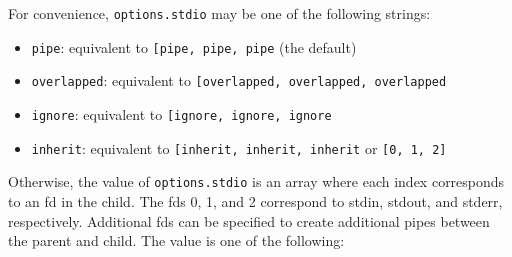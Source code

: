 For convenience, \texttt{options.stdio} may be one of the following
strings:

\begin{itemize}
\tightlist
\item
  \texttt{\textquotesingle{}pipe\textquotesingle{}}: equivalent to
  \texttt{{[}\textquotesingle{}pipe\textquotesingle{},\ \textquotesingle{}pipe\textquotesingle{},\ \textquotesingle{}pipe\textquotesingle{}{]}}
  (the default)
\item
  \texttt{\textquotesingle{}overlapped\textquotesingle{}}: equivalent to
  \texttt{{[}\textquotesingle{}overlapped\textquotesingle{},\ \textquotesingle{}overlapped\textquotesingle{},\ \textquotesingle{}overlapped\textquotesingle{}{]}}
\item
  \texttt{\textquotesingle{}ignore\textquotesingle{}}: equivalent to
  \texttt{{[}\textquotesingle{}ignore\textquotesingle{},\ \textquotesingle{}ignore\textquotesingle{},\ \textquotesingle{}ignore\textquotesingle{}{]}}
\item
  \texttt{\textquotesingle{}inherit\textquotesingle{}}: equivalent to
  \texttt{{[}\textquotesingle{}inherit\textquotesingle{},\ \textquotesingle{}inherit\textquotesingle{},\ \textquotesingle{}inherit\textquotesingle{}{]}}
  or \texttt{{[}0,\ 1,\ 2{]}}
\end{itemize}

Otherwise, the value of \texttt{options.stdio} is an array where each
index corresponds to an fd in the child. The fds 0, 1, and 2 correspond
to stdin, stdout, and stderr, respectively. Additional fds can be
specified to create additional pipes between the parent and child. The
value is one of the following:

